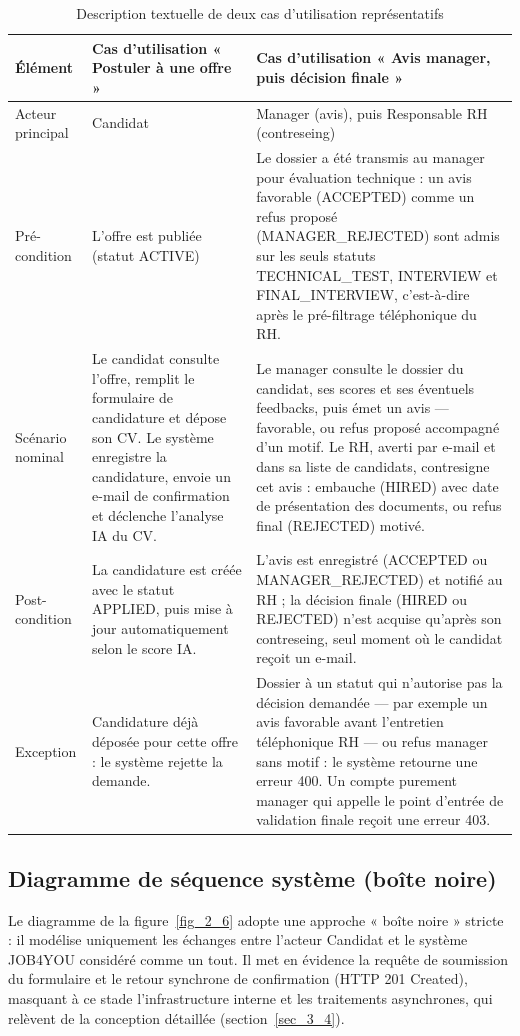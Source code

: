 \setcounter{table}{1}
\begin{table}[!ht]
\centering
\caption{Description textuelle de deux cas d’utilisation représentatifs}
\label{tab_2_2}
\renewcommand{\arraystretch}{1.25}\footnotesize
\setlength{\tabcolsep}{4pt}%
\begin{tabular}{|P{0.097\textwidth}|P{0.311\textwidth}|P{0.538\textwidth}|}
\hline
\textbf{Élément} & \textbf{Cas d’utilisation « Postuler à une offre »} & \textbf{Cas d’utilisation « Avis manager, puis décision finale »} \\
\hline
Acteur principal & Candidat & Manager (avis), puis Responsable RH (contreseing) \\
\hline
Pré-condition & L’offre est publiée (statut ACTIVE) & Le dossier a été transmis au manager pour évaluation technique : un avis favorable (ACCEPTED) comme un refus proposé (MANAGER\_REJECTED) sont admis sur les seuls statuts TECHNICAL\_TEST, INTERVIEW et FINAL\_INTERVIEW, c’est-à-dire après le pré-filtrage téléphonique du RH. \\
\hline
Scénario nominal & Le candidat consulte l’offre, remplit le formulaire de candidature et dépose son CV. Le système enregistre la candidature, envoie un e-mail de confirmation et déclenche l’analyse IA du CV. & Le manager consulte le dossier du candidat, ses scores et ses éventuels feedbacks, puis émet un avis — favorable, ou refus proposé accompagné d’un motif. Le RH, averti par e-mail et dans sa liste de candidats, contresigne cet avis : embauche (HIRED) avec date de présentation des documents, ou refus final (REJECTED) motivé. \\
\hline
Post-condition & La candidature est créée avec le statut APPLIED, puis mise à jour automatiquement selon le score IA. & L’avis est enregistré (ACCEPTED ou MANAGER\_REJECTED) et notifié au RH ; la décision finale (HIRED ou REJECTED) n’est acquise qu’après son contreseing, seul moment où le candidat reçoit un e-mail. \\
\hline
Exception & Candidature déjà déposée pour cette offre : le système rejette la demande. & Dossier à un statut qui n’autorise pas la décision demandée — par exemple un avis favorable avant l’entretien téléphonique RH — ou refus manager sans motif : le système retourne une erreur 400. Un compte purement manager qui appelle le point d’entrée de validation finale reçoit une erreur 403. \\
\hline
\end{tabular}
\end{table}
\subsection{Diagramme de séquence système (boîte noire)}
\label{sec_2_2_7}
Le diagramme de la figure~\ref{fig_2_6} adopte une approche « boîte noire » stricte : il modélise uniquement les échanges entre l’acteur Candidat et le système JOB4YOU considéré comme un tout. Il met en évidence la requête de soumission du formulaire et le retour synchrone de confirmation (HTTP 201 Created), masquant à ce stade l’infrastructure interne et les traitements asynchrones, qui relèvent de la conception détaillée (section~\ref{sec_3_4}).

